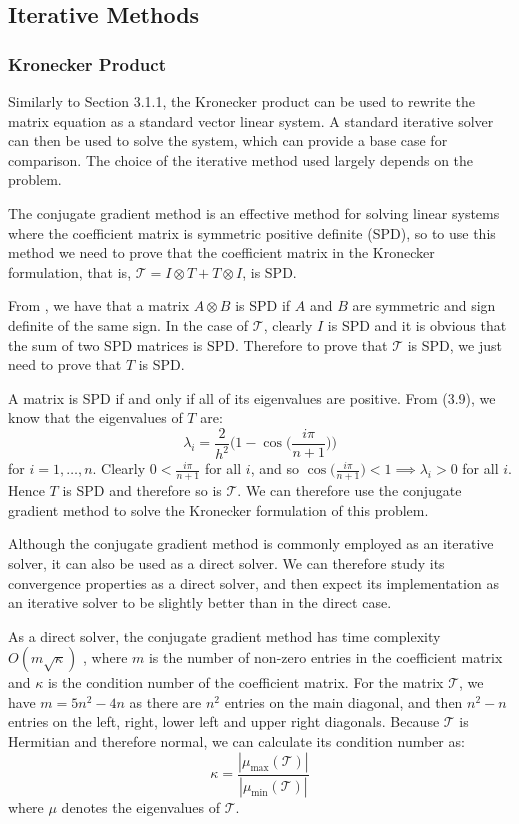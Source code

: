 \documentclass[11pt]{article}
\numberwithin{equation}{section}
\begin{document}
\subsection{Iterative Methods}

\subsubsection{Kronecker Product}
Similarly to Section 3.1.1, the Kronecker product can be used to rewrite the matrix equation as a standard vector linear system. A standard iterative solver can then be used to solve the system, which can provide a base case for comparison. The choice of the iterative method used largely depends on the problem.

The conjugate gradient method is an effective method for solving linear systems where the coefficient matrix is symmetric positive definite (SPD), so to use this method we need to prove that the coefficient matrix in the Kronecker formulation, that is, $\mathcal{T} = I \otimes T + T \otimes I$, is SPD.

From \cite{Brewer}, we have that a matrix $A \otimes B$ is SPD if $A$ and $B$ are symmetric and sign definite of the same sign. In the case of $\mathcal{T}$, clearly $I$ is SPD and it is obvious that the sum of two SPD matrices is SPD. Therefore to prove that $\mathcal{T}$ is SPD, we just need to prove that $T$ is SPD. 

A matrix is SPD if and only if all of its eigenvalues are positive. From (3.9), we know that the eigenvalues of $T$ are: 
\[ \lambda_i = \frac{2}{h^2} \Big( 1 - \cos \Big( \frac{i \pi}{n+1} \Big) \Big) \]
for $i=1, \dots, n$. Clearly $0 < \frac{i \pi}{n+1}$ for all $i$, and so $\cos \Big( \frac{i \pi}{n+1} \Big) < 1 \implies \lambda_i > 0$ for all $i$. Hence $T$ is SPD and therefore so is $\mathcal{T}$. We can therefore use the conjugate gradient method to solve the Kronecker formulation of this problem. 

Although the conjugate gradient method is commonly employed as an iterative solver, it can also be used as a direct solver. We can therefore study its convergence properties as a direct solver, and then expect its implementation as an iterative solver to be slightly better than in the direct case. 

As a direct solver, the conjugate gradient method has time complexity $O(m\sqrt{\kappa})$ \cite{Shewchuk}, where $m$ is the number of non-zero entries in the coefficient matrix and $\kappa$ is the condition number of the coefficient matrix. For the matrix $\mathcal{T}$, we have $m=5n^2 - 4n$ as there are $n^2$ entries on the main diagonal, and then $n^2 - n$ entries on the left, right, lower left and upper right diagonals. Because $\mathcal{T}$ is Hermitian and therefore normal, we can calculate its condition number as:
\begin{equation}
\kappa = \frac{|\mu_{\text{max}}(\mathcal{T})|}{|\mu_{\text{min}}(\mathcal{T})|}
\end{equation}
where $\mu$ denotes the eigenvalues of $\mathcal{T}$. 
\end{document}
